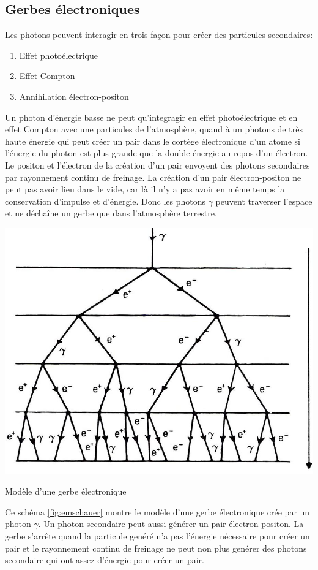 \documentclass[a4paper,11pt,liststotocnumbered,bibtotocnumbered]{scrartcl}
\begin{document}
   \subsection{Gerbes électroniques}
    Les photons peuvent interagir en trois fa\c con pour créer des particules secondaires:
    \begin{enumerate}
     \item{Effet photoélectrique}
     \item{Effet Compton}
     \item{Annihilation électron-positon}
    \end{enumerate}
    Un photon d'énergie basse ne peut qu'integragir en effet photoélectrique et en effet Compton avec une particules de l'atmosphère, quand à un photons de très haute énergie qui peut créer un pair dans le cortège électronique d'un atome si l'énergie du photon est plus grande que la double énergie au repos d'un électron. Le positon et l'électron de la création d'un pair envoyent des photons secondaires par rayonnement continu de freinage.
    La création d'un pair électron-positon ne peut pas avoir lieu dans le vide, car là il n'y a pas avoir en même temps la conservation d'impulse et d'énergie. Donc les photons $\gamma$ peuvent traverser l'espace et ne déchaîne un gerbe que dans l'atmosphère terrestre.

    \begin{figurehere}
     \begin{minipage}{0.45\textwidth}
      \center 
     \includegraphics[width=\textwidth]{bilder/emschauer.jpg}   
     \caption{Modèle d'une gerbe électronique}   
     \label{fig:emschauer}  
     \end{minipage}
     \begin{minipage}{0.5\textwidth}
      Ce schéma \ref{fig:emschauer} montre le modèle d'une gerbe électronique crée par un photon $\gamma$. Un photon secondaire peut aussi générer un pair électron-positon. La gerbe s'arrête quand la particule genéré n'a pas l'énergie nécessaire pour créer un pair et le rayonnement continu de freinage ne peut non plus genérer des photons secondaire qui ont assez d'énergie pour créer un pair.
     \end{minipage}
    \end{figurehere}
 
\end{document}
